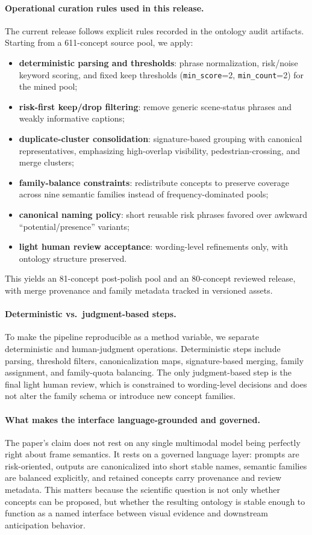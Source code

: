 \paragraph{Operational curation rules used in this release.}
The current release follows explicit rules recorded in the ontology audit
artifacts. Starting from a 611-concept source pool, we apply:
\begin{itemize}[leftmargin=1.4em,topsep=2pt,itemsep=1pt]
  \item \textbf{deterministic parsing and thresholds}: phrase normalization, risk/noise keyword scoring, and fixed keep thresholds (\texttt{min\_score}=2, \texttt{min\_count}=2) for the mined pool;
  \item \textbf{risk-first keep/drop filtering}: remove generic scene-status phrases and weakly informative captions;
  \item \textbf{duplicate-cluster consolidation}: signature-based grouping with canonical representatives, emphasizing high-overlap visibility, pedestrian-crossing, and merge clusters;
  \item \textbf{family-balance constraints}: redistribute concepts to preserve coverage across nine semantic families instead of frequency-dominated pools;
  \item \textbf{canonical naming policy}: short reusable risk phrases favored over awkward ``potential/presence'' variants;
  \item \textbf{light human review acceptance}: wording-level refinements only, with ontology structure preserved.
\end{itemize}
This yields an 81-concept post-polish pool and an 80-concept reviewed release,
with merge provenance and family metadata tracked in versioned assets.

\paragraph{Deterministic vs.\ judgment-based steps.}
To make the pipeline reproducible as a method variable, we separate deterministic
and human-judgment operations. Deterministic steps include parsing, threshold
filters, canonicalization maps, signature-based merging, family assignment, and
family-quota balancing. The only judgment-based step is the final light human
review, which is constrained to wording-level decisions and does not alter the
family schema or introduce new concept families.

\paragraph{What makes the interface language-grounded and governed.}
The paper's claim does not rest on any single multimodal model being perfectly
right about frame semantics. It rests on a governed language layer: prompts are
risk-oriented, outputs are canonicalized into short stable names, semantic
families are balanced explicitly, and retained concepts carry provenance and
review metadata. This matters because the scientific question is not only
whether concepts can be proposed, but whether the resulting ontology is stable
enough to function as a named interface between visual evidence and downstream
anticipation behavior.

